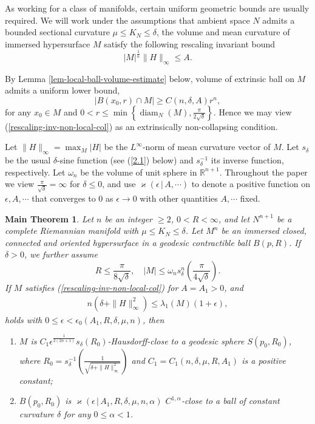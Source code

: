 \documentclass{amsart}
\numberwithin{equation}{section}
\newtheorem*{mainthm}{Main Theorem}
\theoremstyle{remark}
\renewcommand{\(}{\left(}
\renewcommand{\)}{\right)}
\renewcommand{\~}{\tilde}
\renewcommand{\-}{\overline}
\renewcommand{\d}{\delta}
\newcommand{\e}{\epsilon}
\renewcommand{\l}{\lambda}
\begin{document}
As working for a class of manifolds, certain uniform geometric bounds are usually required. We will work under the assumptions that ambient space $N$ admits a bounded sectional curvature $\mu \leq K_N\leq \d$, the volume and mean curvature of immersed hypersurface $M$ satisfy the following rescaling invariant bound
\begin{equation}\label{rescaling-inv-non-local-col}
|M|^\frac{1}{n}\|H\|_\infty\leq A.
\end{equation}

By Lemma \ref{lem-local-ball-volume-estimate} below, volume of extrinsic ball on $M$ admits a uniform lower bound,
\begin{equation}\label{relative-non-collapsing}
|B(x_0,r)\cap M|\ge C(n,\d, A)r^n, 
\end{equation}
for any $x_0\in M$ and $0<r\le \min\left\{\operatorname{diam}_N(M), \frac{\pi}{2\sqrt{\d}}\right\}$.
Hence we may view (\ref{rescaling-inv-non-local-col}) as an extrinsically non-collapsing condition.

Let $\|H\|_\infty=\max_{M}|H|$ be the $L^\infty$-norm of mean curvature vector of $M$. Let $s_\delta$ be the usual $\delta$-sine function (see (\ref{2.1}) below) and $s_\d^{-1}$ its inverse function, respectively. Let $\omega_n$ be the volume of unit sphere in $\mathbb R^{n+1}$. Throughout the paper we view $\frac{\pi}{\sqrt{\d}}=\infty$ for $\d\le 0$, and use  $\varkappa(\epsilon\,|\,A,\cdots)$ to denote a positive function on $\epsilon, A,\cdots$ that converges to $0$ as $\epsilon\to 0$ with  other quantities $A,\cdots$ fixed.

\begin{mainthm}
	Let $n$ be an integer $\ge 2$, $0<R< \infty$, and let $N^{n+1}$ be a complete Riemannian manifold with $\mu \leq K_N\leq \d$. Let $M^n$ be an immersed closed, connected and oriented hypersurface in a geodesic contractible ball $B(p,R)$. If $\d>0$, we further assume
	\begin{equation}\label{location-size}
	R\le \frac{\pi}{8\sqrt{\d}},\quad |M|\le \omega_n s_\d^n\(\frac{\pi}{4\sqrt{\d}}\).
	\end{equation}
	If $M$ satisfies (\ref{rescaling-inv-non-local-col}) for $A=A_1>0$, and
	\begin{align}\label{pinching-condition-1}
	n(\d+\|H\|_\infty^2) \leq \l_1(M)(1+\e),
	\end{align}
	holds with $0\le \e<\e_0(A_1,R,\d,\mu,n)$,
	then
	\begin{enumerate}
		\item[(M1)]
		$M$ is $C_1\e^\frac{1}{2(2n+1)} s_\d(R_0)$-Hausdorff-close to a geodesic sphere $S(p_0,R_0)$, where $R_0=s_\d^{-1}(\frac{1}{\sqrt{\d+\|H\|_{\infty}^2}})$ and
		$C_1=C_1(n,\d,\mu,R,A_1)$ is a positive constant;
		\item[(M2)]
		$B(p_0,R_0)$ is $\varkappa(\epsilon\,|\,A_1,R,\d,\mu,n,\alpha)$ $C^{1,\alpha}$-close to a ball of constant curvature $\delta$ for any $0\le \alpha<1$.
	\end{enumerate}
\end{mainthm}
\end{document}
